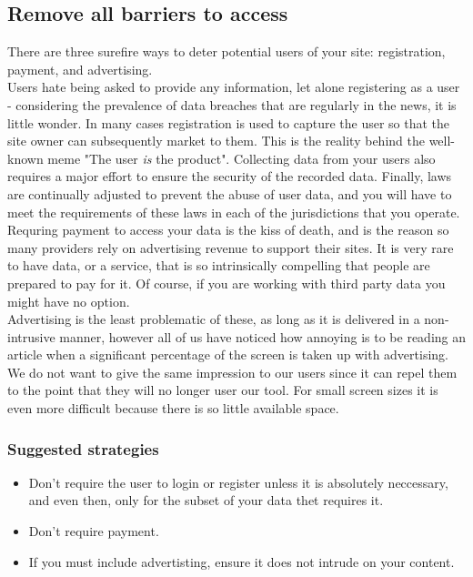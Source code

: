 \subsection{Remove all barriers to access}

There are three surefire ways to deter potential users of your site: registration, payment, and advertising.\\

Users hate being asked to provide any information, let alone registering as a user - considering the prevalence of data breaches that are regularly in the news, it is little wonder.
In many cases registration is used to capture the user so that the site owner can subsequently market to them.
This is the reality behind the well-known meme "The user \emph{is} the product".
Collecting data from your users also requires a major effort to ensure the security of the recorded data.
Finally, laws are continually adjusted to prevent the abuse of user data, and you will have to meet the requirements of these laws in each of the jurisdictions that you operate. \\

Requring payment to access your data is the kiss of death, and is the reason so many providers rely on advertising 
revenue to support their sites. It is very rare to have data, or a service, that is so intrinsically compelling that
people are prepared to pay for it.
Of course, if you are working with third party data you might have no option. \\

Advertising is the least problematic of these, as long as it is delivered in a non-intrusive manner, however
all of us have noticed how annoying is to be reading an article when a significant percentage of the screen is taken up with advertising.
We do not want to give the same impression to our users since it can repel them to the point that they will no longer
user our tool. For small screen sizes it is even more difficult because there is so little available space.\\

\subsubsection*{Suggested strategies} 

\begin{itemize}
    \item Don't require the user to login or register unless it is absolutely neccessary, and even then, only for the subset
    of your data thet requires it.
    \item Don't require payment.
    \item If you must include advertisting, ensure it does not intrude on your content.
\end{itemize}

